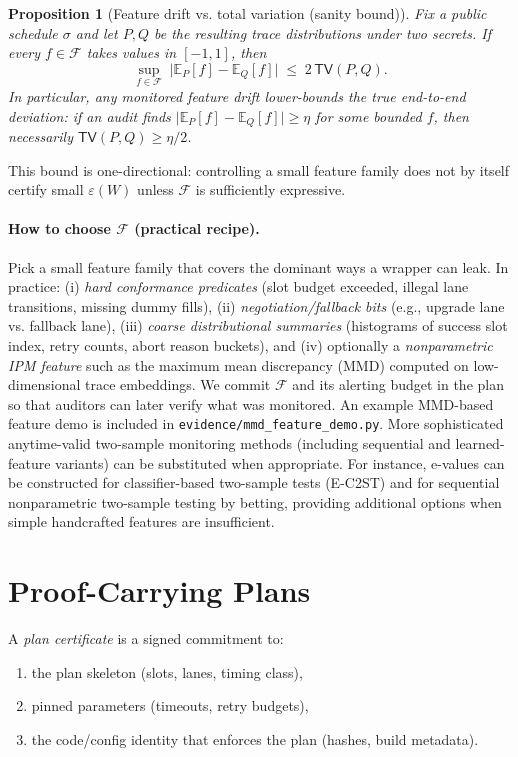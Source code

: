 \documentclass[11pt]{article}
\newtheorem{proposition}{Proposition}
\newcommand{\tv}{\ensuremath{\mathsf{TV}}}
\begin{document}
\begin{proposition}[Feature drift vs. total variation (sanity bound)]
Fix a public schedule $\sigma$ and let $P,Q$ be the resulting trace distributions under two secrets.
If every $f\in\mathcal{F}$ takes values in $[-1,1]$, then
\[\sup_{f\in\mathcal{F}}\;\big|\mathbb{E}_P[f]-\mathbb{E}_Q[f]\big| \;\le\; 2\,\tv(P,Q).\]
In particular, any monitored feature drift lower-bounds the true end-to-end deviation: if an audit finds
$\big|\mathbb{E}_P[f]-\mathbb{E}_Q[f]\big|\ge \eta$ for some bounded $f$, then necessarily $\tv(P,Q)\ge \eta/2$.
\end{proposition}

This bound is one-directional: controlling a small feature family does not by itself certify small $\varepsilon(W)$ unless $\mathcal{F}$ is sufficiently expressive.

\paragraph{How to choose $\mathcal{F}$ (practical recipe).}
Pick a small feature family that covers the dominant ways a wrapper can leak.
In practice: (i) \emph{hard conformance predicates} (slot budget exceeded, illegal lane transitions, missing dummy fills),
(ii) \emph{negotiation/fallback bits} (e.g., upgrade lane vs. fallback lane),
(iii) \emph{coarse distributional summaries} (histograms of success slot index, retry counts, abort reason buckets),
and (iv) optionally a \emph{nonparametric IPM feature} such as the maximum mean discrepancy (MMD) computed on low-dimensional trace embeddings.\cite{grettonKernelTwoSample2012,sriperumbudurIPM2012}
We commit $\mathcal{F}$ and its alerting budget in the plan so that auditors can later verify what was monitored. An example MMD-based feature demo is included in \texttt{evidence/mmd\_feature\_demo.py}. More sophisticated anytime-valid two-sample monitoring methods (including sequential and learned-feature variants) can be substituted when appropriate.\cite{pandevaDAVT2024}
For instance, e-values can be constructed for classifier-based two-sample tests (E-C2ST) and for sequential nonparametric two-sample testing by betting, providing additional options when simple handcrafted features are insufficient.\cite{pandevaEC2ST2024,podkopaevSequentialPredictive2023}


\section{Proof-Carrying Plans}
A \emph{plan certificate} is a signed commitment to:
\begin{enumerate}[leftmargin=*]
  \item the plan skeleton (slots, lanes, timing class),
  \item pinned parameters (timeouts, retry budgets),
  \item the code/config identity that enforces the plan (hashes, build metadata).
\end{enumerate}
\end{document}
